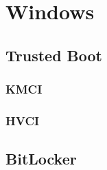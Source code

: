 
\section{Windows}

\subsection{Trusted Boot}
\subsubsection{KMCI}
\subsubsection{HVCI}
\subsection{BitLocker}


